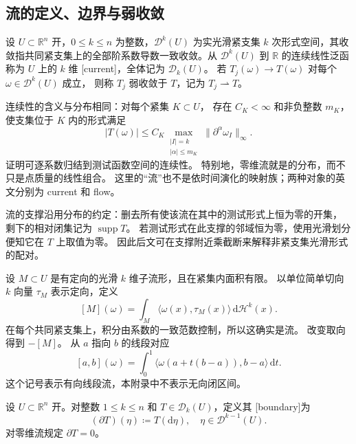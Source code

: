 \subsection{流的定义、边界与弱收敛}
\label{b1:subsec:D10202}

\begin{definition}\label{b1:def:app-d-current}
设 \(U\subset\mathbb R^n\) 开，\(0\le k\le n\) 为整数，\(\mathcal D^k(U)\) 为实光滑紧支集 \(k\) 次形式空间，其收敛指共同紧支集上的全部阶系数导数一致收敛。从 \(\mathcal D^k(U)\) 到 \(\mathbb R\) 的连续线性泛函称为 \(U\) 上的 \(k\) 维%
[current]，全体记为 \(\mathcal D_k(U)\)。
若 \(T_j(\omega)\to T(\omega)\) 对每个 \(\omega\in\mathcal D^k(U)\) 成立，
则称 \(T_j\) 弱收敛于 \(T\)，记为 \(T_j\rightharpoonup T\)。
\end{definition}

连续性的含义与分布相同：对每个紧集 \(K\subset U\)，
存在 \(C_K<\infty\) 和非负整数 \(m_K\)，使支集位于 \(K\) 内的形式满足
\[
 |T(\omega)|\leq
 C_K\max_{\substack{|I|=k\\|\alpha|\leq m_K}}
       \|\partial^\alpha\omega_I\|_\infty.
\]
证明可逐系数归结到测试函数空间的连续性。
特别地，零维流就是的分布，而不只是点质量的线性组合。
这里的“流”也不是依时间演化的映射族；两种对象的英文分别为 current 和 flow。

\ProseParagraphBreak

流的支撑沿用分布的约定：删去所有使该流在其中的测试形式上恒为零的开集，
剩下的相对闭集记为 \(\operatorname{supp}T\)。
若测试形式在此支撑的邻域恒为零，使用光滑划分便知它在 \(T\) 上取值为零。
因此后文可在支撑附近乘截断来解释非紧支集光滑形式的配对。

\ProseParagraphBreak

设 \(M\subset U\) 是有定向的光滑 \(k\) 维子流形，且在紧集内面积有限。
以单位简单切向 \(k\) 向量 \(\tau_M\) 表示定向，定义
\[
 [M](\omega)=\int_M\langle\omega(x),\tau_M(x)\rangle\,\mathrm{d}\mathcal H^k(x).
\]
在每个共同紧支集上，积分由系数的一致范数控制，所以这确实是流。
改变取向得到 \(-[M]\)。
从 \(a\) 指向 \(b\) 的线段对应
\[
 [a,b](\omega)
 =\int_0^1\langle\omega(a+t(b-a)),b-a\rangle\,\mathrm{d}t.
\]
这个记号表示有向线段流，本附录中不表示无向闭区间。

\begin{definition}\label{b1:def:app-d-current-boundary}
设 \(U\subset\mathbb R^n\) 开。对整数 \(1\le k\le n\) 和 \(T\in\mathcal D_k(U)\)，定义其%
[boundary]为
\[
 (\partial T)(\eta)\coloneqq T(\mathrm{d}\eta),
 \quad\eta\in\mathcal D^{k-1}(U).
\]
对零维流规定 \(\partial T=0\)。
\end{definition}

